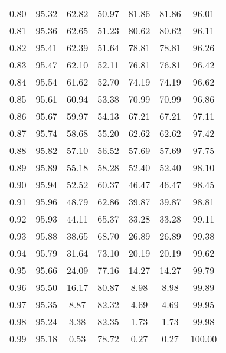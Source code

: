 \begin{tabular}{|c|c|c|c|c|c|c|}
      0.80 &     95.32 &     62.82 &      50.97 &   81.86 &      81.86 &         96.01 \\
      0.81 &     95.36 &     62.65 &      51.23 &   80.62 &      80.62 &         96.11 \\
      0.82 &     95.41 &     62.39 &      51.64 &   78.81 &      78.81 &         96.26 \\
      0.83 &     95.47 &     62.10 &      52.11 &   76.81 &      76.81 &         96.42 \\
      0.84 &     95.54 &     61.62 &      52.70 &   74.19 &      74.19 &         96.62 \\
      0.85 &     95.61 &     60.94 &      53.38 &   70.99 &      70.99 &         96.86 \\
      0.86 &     95.67 &     59.97 &      54.13 &   67.21 &      67.21 &         97.11 \\
      0.87 &     95.74 &     58.68 &      55.20 &   62.62 &      62.62 &         97.42 \\
      0.88 &     95.82 &     57.10 &      56.52 &   57.69 &      57.69 &         97.75 \\
      0.89 &     95.89 &     55.18 &      58.28 &   52.40 &      52.40 &         98.10 \\
      0.90 &     95.94 &     52.52 &      60.37 &   46.47 &      46.47 &         98.45 \\
      0.91 &     95.96 &     48.79 &      62.86 &   39.87 &      39.87 &         98.81 \\
      0.92 &     95.93 &     44.11 &      65.37 &   33.28 &      33.28 &         99.11 \\
      0.93 &     95.88 &     38.65 &      68.70 &   26.89 &      26.89 &         99.38 \\
      0.94 &     95.79 &     31.64 &      73.10 &   20.19 &      20.19 &         99.62 \\
      0.95 &     95.66 &     24.09 &      77.16 &   14.27 &      14.27 &         99.79 \\
      0.96 &     95.50 &     16.17 &      80.87 &    8.98 &       8.98 &         99.89 \\
      0.97 &     95.35 &      8.87 &      82.32 &    4.69 &       4.69 &         99.95 \\
      0.98 &     95.24 &      3.38 &      82.35 &    1.73 &       1.73 &         99.98 \\
      0.99 &     95.18 &      0.53 &      78.72 &    0.27 &       0.27 &        100.00 \\
\bottomrule
\end{tabular}
